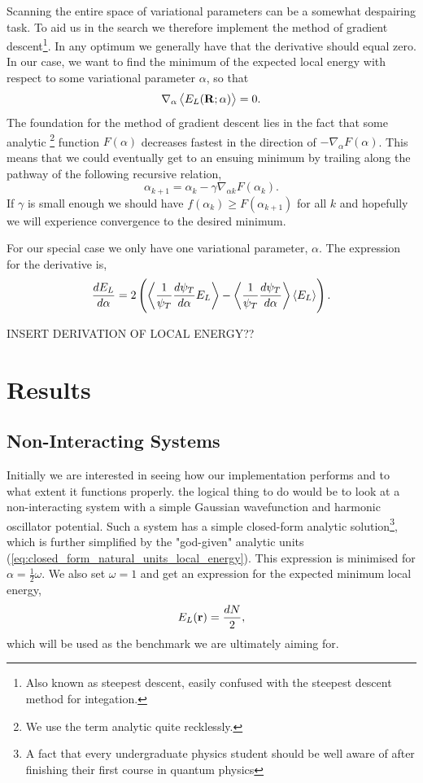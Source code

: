 \documentclass[
    a4paper, aps, twocolumn, floatfix, superscriptaddress, nofootinbib]{revtex4-1}
\newcommand{\1}{\mathds{1}}
\begin{document}
		Scanning the entire space of variational parameters can be a somewhat despairing task. To aid us in the search we
		therefore implement the method of gradient descent\footnote{Also known as steepest descent, easily confused
		with the steepest descent method for integation.}. In any optimum we generally have that the derivative should equal
		zero. In our case, we want to find the minimum of the expected local energy with respect to some variational
		parameter $\alpha$, so that
		\begin{equation}
			\nabla_\alpha \expval{E_L(\mathbf{R}; \alpha)} = 0.
		\end{equation}	
		The foundation for  the method of gradient descent lies in the fact that some analytic
		\footnote{We use the term analytic quite recklessly.} function $F(\alpha)$ decreases fastest in the direction
		of $-\nabla_\alpha F(\alpha)$. This means that we could eventually get to an ensuing minimum by trailing along the
		pathway of the following recursive relation,
		\begin{equation}
			\alpha_{k+1} = \alpha_k - \gamma \nabla_{\alpha k} F(\alpha_k).
		\end{equation}
		If $\gamma$ is small enough we should have $f(\alpha_k) \geq F(\alpha_{k+1})$ for all $k$ and hopefully we will
		experience convergence to the desired minimum. 
		
		For our special case we only have one variational parameter, $\alpha$.  The expression for the derivative is, 
		\begin{equation}
			\frac{d E_L}{d\alpha} = 
				2\left( \expval{\frac{1}{\psi_T}\frac{d\psi_T}{d\alpha} E_L} - \expval{\frac{1}{\psi_T} \frac{d\psi_T}{d\alpha}}\expval{E_L} \right).
		\end{equation}
		
		INSERT DERIVATION OF LOCAL ENERGY??

\section{Results}

    \subsection{Non-Interacting Systems}
    Initially we are interested in seeing how our implementation performs and to what extent it functions properly.
    the logical thing to do would be to look at a non-interacting system with a simple Gaussian wavefunction and
    harmonic oscillator potential. Such a system has a simple closed-form analytic solution\footnote{A fact that every
    undergraduate physics student should be well aware of after finishing their first course in quantum physics}, 
    which is further simplified by the "god-given" analytic
    units (\autoref{eq:closed_form_natural_units_local_energy}). This expression is minimised for
    $\alpha = \frac{1}{2}\omega$. We also set $\omega = 1$ and get an expression for the
    expected minimum local energy,
    \begin{equation}
        E_L(\vb{r}) = \frac{dN}{2},
    \end{equation}
    which will be used as the benchmark we are ultimately aiming for.
\end{document}
